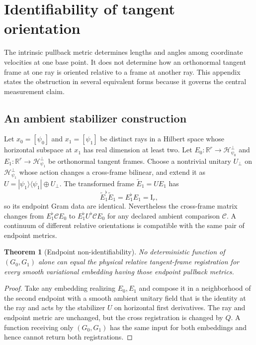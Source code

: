 \documentclass[10pt,twocolumn]{article}
\newtheorem{theorem}{Theorem}[section]
\theoremstyle{definition}
\theoremstyle{remark}
\newcommand{\R}{\mathbb R}
\newcommand{\Hh}{\mathcal H}
\newcommand{\Id}{\mathrm I}
\begin{document}
\section{Identifiability of tangent orientation}
\label{app:identifiability}

The intrinsic pullback metric determines lengths and angles among coordinate
velocities at one base point.  It does not determine how an orthonormal
tangent frame at one ray is oriented relative to a frame at another ray.
This appendix states the obstruction in several equivalent forms because it
governs the central measurement claim.

\subsection{An ambient stabilizer construction}

Let $x_0=[\psi_0]$ and $x_1=[\psi_1]$ be distinct rays in a Hilbert space whose
horizontal subspace at $x_1$ has real dimension at least two.  Let
$E_0:\R^r\to\Hh_{\psi_0}^\perp$ and
$E_1:\R^r\to\Hh_{\psi_1}^\perp$ be orthonormal tangent frames.  Choose a
nontrivial unitary $U_\perp$ on $\Hh_{\psi_1}^\perp$ whose action changes a
cross-frame bilinear, and extend it as
$U=|\psi_1\rangle\langle\psi_1|\oplus U_\perp$.  The transformed frame
$\widetilde E_1=UE_1$ has
\begin{equation}
 \widetilde E_1^\flat\widetilde E_1
 =E_1^\flat E_1=\Id_r ,
 \label{eq:appsameendpointgram}
\end{equation}
so its endpoint Gram data are identical.  Nevertheless the cross-frame
matrix changes from $E_1^\flat\mathcal C E_0$ to
$E_1^\flat U^\flat\mathcal C E_0$ for any declared ambient comparison
$\mathcal C$.  A continuum of different relative orientations is compatible
with the same pair of endpoint metrics.

\begin{theorem}[Endpoint non-identifiability]
\label{thm:endpointnonid}
No deterministic function of $(G_0,G_1)$ alone can equal the physical
relative tangent-frame registration for every smooth variational embedding
having those endpoint pullback metrics.
\end{theorem}
\begin{proof}
Take any embedding realizing $E_0,E_1$ and compose it in a neighborhood of the
second endpoint with a smooth ambient unitary field that is the identity at
the ray and acts by the stabilizer $U$ on horizontal first derivatives.  The
ray and endpoint metric are unchanged, but the cross registration is changed
by $Q$.  A function receiving only $(G_0,G_1)$ has the same input for both
embeddings and hence cannot return both registrations.
\end{proof}
\end{document}
